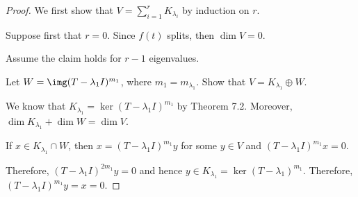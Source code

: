 \documentclass[11pt]{scrartcl}
\begin{document}
  \begin{proof}
    \hfill

    We first show that $V = \sum_{i=1}^r K_{\lambda_i}$ by induction on $r$.

    Suppose first that $r = 0$. Since $f(t)$ splits, then $\dim V = 0$.

    Assume the claim holds for $r-1$ eigenvalues.

    \begin{claim*}
      Let $W = \img (T-\lambda_1 I)^{m_1}$, where $m_1 = m_{\lambda_1}$. Show that $V = K_{\lambda_1}\oplus W$.
    \end{claim*}

    We know that $K_{\lambda_1}=\ker (T-\lambda_1I)^{m_1}$ by Theorem
    7.2. Moreover, $\dim K_{\lambda_1}+\dim W = \dim V$.

    If $x\in K_{\lambda_1}\cap W$, then $x= (T-\lambda_1 I)^{m_1}y$ for some $y\in V$ and $(T-\lambda_1I)^{m_1}x = 0$.

    Therefore, $(T-\lambda_1 I)^{2m_1}y = 0$ and hence $y\in K_{\lambda_1} = \ker (T-\lambda_1)^{m_{1}}$. Therefore, $(T-\lambda_1I)^{m_1}y = x = 0$.

  \end{proof}
\end{document}
